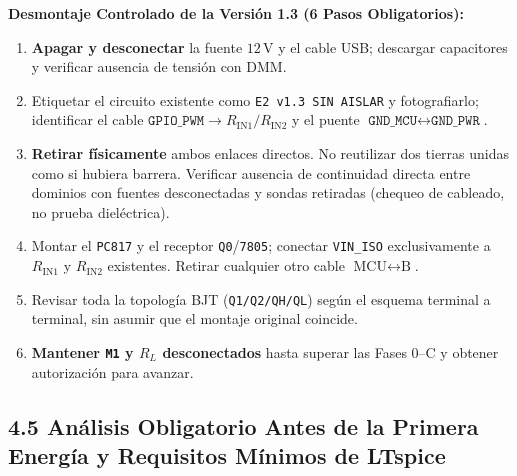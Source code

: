\documentclass[10pt, a4paper, landscape]{article}
\begin{document}
\begin{minipage}[t]{0.48\linewidth}
\sloppy
\textbf{Desmontaje Controlado de la Versión 1.3 (6 Pasos Obligatorios):}
\begin{enumerate}[noitemsep, topsep=2pt]
    \item \textbf{Apagar y desconectar} la fuente $12\,\text{V}$ y el cable USB; descargar capacitores y verificar ausencia de tensión con DMM.
    \item Etiquetar el circuito existente como \texttt{E2 v1.3 SIN AISLAR} y fotografiarlo; identificar el cable $\texttt{GPIO\_PWM} \rightarrow R_{\text{IN1}}/R_{\text{IN2}}$ y el puente $\texttt{GND\_MCU} \leftrightarrow \texttt{GND\_PWR}$.
    \item \textbf{Retirar físicamente} ambos enlaces directos. No reutilizar dos tierras unidas como si hubiera barrera. Verificar ausencia de continuidad directa entre dominios con fuentes desconectadas y sondas retiradas (chequeo de cableado, no prueba dieléctrica).
    \item Montar el \texttt{PC817} y el receptor \texttt{Q0}/\texttt{7805}; conectar \texttt{VIN\_ISO} exclusivamente a $R_{\text{IN1}}$ y $R_{\text{IN2}}$ existentes. Retirar cualquier otro cable $\text{MCU} \leftrightarrow \text{B}$.
    \item Revisar toda la topología BJT (\texttt{Q1/Q2/QH/QL}) según el esquema terminal a terminal, sin asumir que el montaje original coincide.
    \item \textbf{Mantener \texttt{M1} y $R_L$ desconectados} hasta superar las Fases 0--C y obtener autorización para avanzar.
\end{enumerate}
\end{minipage}

\subsection*{4.5 Análisis Obligatorio Antes de la Primera Energía y Requisitos Mínimos de LTspice}
\end{document}
